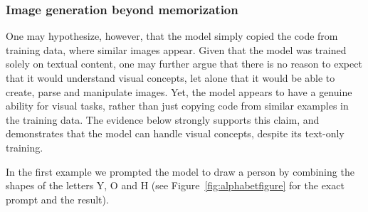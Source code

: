 \subsubsection{Image generation beyond memorization}
One may hypothesize, however, that the model simply copied the code from training data, where similar images appear. Given that the model was trained solely on textual content, one may further argue that there is no reason to expect that it would understand visual concepts, let alone that it would be able to create, parse and manipulate images. Yet, the model appears to have a genuine ability for visual tasks, rather than just copying code from similar examples in the training data. The evidence below strongly supports this claim, and demonstrates that the model can handle visual concepts, despite its text-only training.
\newline

In the first example we prompted the model to draw a person by combining the shapes of the letters Y, O and H (see Figure~\ref{fig:alphabetfigure} for the exact prompt and the result). 

